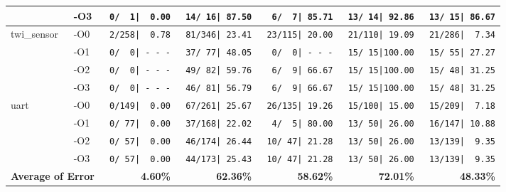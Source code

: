 \begin{tabular}{@{}llrrrrr@{}}
    & -O3 & \texttt{  0/~~1|~~0.00} & \texttt{ 14/~16|~87.50} & \texttt{  6/~~7|~85.71} & \texttt{ 13/~14|~92.86} & \texttt{ 13/~15|~86.67} \\ \midrule
\multirow{4}{*}{twi\_sensor}
    & -O0 & \texttt{  2/258|~~0.78} & \texttt{ 81/346|~23.41} & \texttt{ 23/115|~20.00} & \texttt{ 21/110|~19.09} & \texttt{ 21/286|~~7.34} \\
    & -O1 & \texttt{  0/~~0|~-~-~-} & \texttt{ 37/~77|~48.05} & \texttt{  0/~~0|~-~-~-} & \texttt{ 15/~15|100.00} & \texttt{ 15/~55|~27.27} \\
    & -O2 & \texttt{  0/~~0|~-~-~-} & \texttt{ 49/~82|~59.76} & \texttt{  6/~~9|~66.67} & \texttt{ 15/~15|100.00} & \texttt{ 15/~48|~31.25} \\
    & -O3 & \texttt{  0/~~0|~-~-~-} & \texttt{ 46/~81|~56.79} & \texttt{  6/~~9|~66.67} & \texttt{ 15/~15|100.00} & \texttt{ 15/~48|~31.25} \\ \midrule
\multirow{4}{*}{uart}
    & -O0 & \texttt{  0/149|~~0.00} & \texttt{ 67/261|~25.67} & \texttt{ 26/135|~19.26} & \texttt{ 15/100|~15.00} & \texttt{ 15/209|~~7.18} \\
    & -O1 & \texttt{  0/~77|~~0.00} & \texttt{ 37/168|~22.02} & \texttt{  4/~~5|~80.00} & \texttt{ 13/~50|~26.00} & \texttt{ 16/147|~10.88} \\
    & -O2 & \texttt{  0/~57|~~0.00} & \texttt{ 46/174|~26.44} & \texttt{ 10/~47|~21.28} & \texttt{ 13/~50|~26.00} & \texttt{ 13/139|~~9.35} \\
    & -O3 & \texttt{  0/~57|~~0.00} & \texttt{ 44/173|~25.43} & \texttt{ 10/~47|~21.28} & \texttt{ 13/~50|~26.00} & \texttt{ 13/139|~~9.35} \\ \midrule
\multicolumn{2}{l}{\textbf{Average of Error}}
    & \textbf{4.60\%} & \textbf{62.36\%} & \textbf{58.62\%} & \textbf{72.01\%} & \textbf{48.33\%} \\ \bottomrule
\end{tabular}